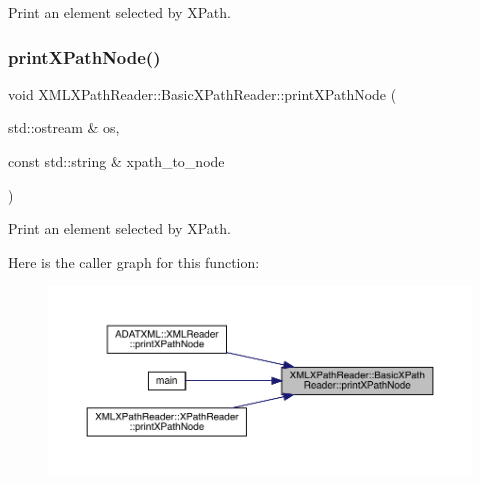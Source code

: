 Print an element selected by X\+Path. 

\mbox{\label{classXMLXPathReader_1_1BasicXPathReader_afba694dbda7c2e1c26ca344085bfffb6}} 
\subsubsection{\texorpdfstring{printXPathNode()}{printXPathNode()}\hspace{0.1cm}{\footnotesize\ttfamily [2/2]}}
{\footnotesize\ttfamily void X\+M\+L\+X\+Path\+Reader\+::\+Basic\+X\+Path\+Reader\+::print\+X\+Path\+Node (\begin{DoxyParamCaption}\item[{std\+::ostream \&}]{os,  }\item[{const std\+::string \&}]{xpath\+\_\+to\+\_\+node }\end{DoxyParamCaption})}



Print an element selected by X\+Path. 

Here is the caller graph for this function\+:\nopagebreak
\begin{figure}[H]
\begin{center}
\leavevmode
\includegraphics[width=350pt]{d6/dbf/classXMLXPathReader_1_1BasicXPathReader_afba694dbda7c2e1c26ca344085bfffb6_icgraph}
\end{center}
\end{figure}
\mbox{\label{classXMLXPathReader_1_1BasicXPathReader_a6c6d6e977694344a70506a24bebe853d}} 
